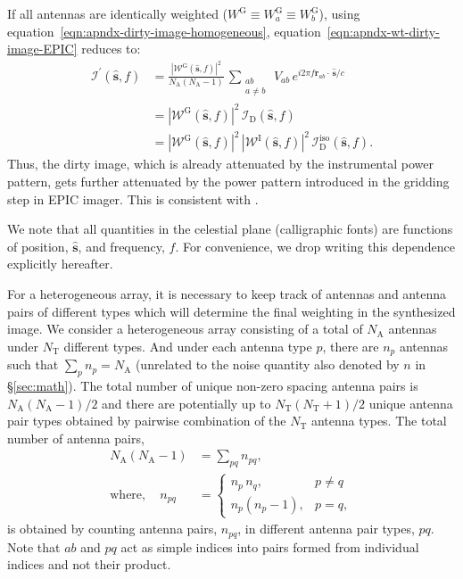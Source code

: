 \documentclass[a4paper,fleqn,usenatbib]{mnras}
\newcommand{\Nant}{N_\textrm{A}}
\begin{document}
If all antennas are identically weighted ($W^\textrm{G} \equiv W^\textrm{G}_a \equiv W^\textrm{G}_b$), using equation~\ref{eqn:apndx-dirty-image-homogeneous}, equation~\ref{eqn:apndx-wt-dirty-image-EPIC} reduces to: 
\begin{align}\label{eqn:apndx-wt-dirty-image-homogeneous}
  \mathcal{I}^\prime(\hat{\mathbf{s}},f) &= \frac{\left|\mathcal{W}^\textrm{G}(\hat{\mathbf{s}},f)\right|^2}{\Nant(\Nant-1)}\,\sum_{\substack{ab\\a\ne b}}\,V_{ab}\,e^{i 2\pi f\mathbf{r}_{ab}\!\cdot\,\hat{\mathbf{s}}/c} \nonumber\\
  &= \left|\mathcal{W}^\textrm{G}(\hat{\mathbf{s}},f)\right|^2\,\mathcal{I}_\textrm{D}(\hat{\mathbf{s}},f) \nonumber\\
  &= \left|\mathcal{W}^\textrm{G}(\hat{\mathbf{s}},f)\right|^2\,\left|\mathcal{W}^\textrm{I}(\hat{\mathbf{s}},f)\right|^2\,\mathcal{I}_\textrm{D}^\textrm{iso}(\hat{\mathbf{s}},f).
\end{align}
Thus, the dirty image, which is already attenuated by the instrumental power pattern, gets further attenuated by the power pattern introduced in the gridding step in EPIC imager. This is consistent with \citet{mor09}. 

We note that all quantities in the celestial plane (calligraphic fonts) are functions of position, $\hat{\mathbf{s}}$, and frequency, $f$. For convenience, we drop writing this dependence explicitly hereafter.

For a heterogeneous array, it is necessary to keep track of antennas and antenna pairs of different types which will determine the final weighting in the synthesized image. We consider a heterogeneous array consisting of a total of $\Nant$ antennas under $N_\textrm{T}$ different types. And under each antenna type $p$, there are $n_p$ antennas such that $\sum_p n_p = \Nant$ (unrelated to the noise quantity also denoted by $n$ in \S\ref{sec:math}). The total number of unique non-zero spacing antenna pairs is $\Nant(\Nant-1)/2$ and there are potentially up to $N_\textrm{T}(N_\textrm{T}+1)/2$ unique antenna pair types obtained by pairwise combination of the $N_\textrm{T}$ antenna types. The total number of antenna pairs, 
\begin{align}\label{eqn:apndx-total-baselines}
  \Nant(\Nant-1) &= \sum_{pq} n_{pq}, \\
  \textrm{where}, \quad   n_{pq} &= \begin{cases}
    n_p\,n_q, & p\ne q \\
    n_p(n_p-1), & p=q, 
  \end{cases}
\end{align}
is obtained by counting antenna pairs, $n_{pq}$, in different antenna pair types, $pq$. Note that $ab$ and $pq$ act as simple indices into pairs formed from individual indices and not their product.
\end{document}

